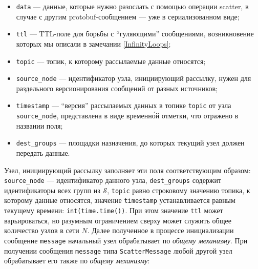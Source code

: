 \begin{itemize}
    \item \texttt{data} --- данные, которые нужно разослать с помощью операции scatter, в случае с другим protobuf-сообщением --- уже в сериализованном виде;
    
    \item \texttt{ttl} --- TTL-поле для борьбы с \enquote{гуляющими} сообщениями, возникновение которых мы описали в замечании \ref{InfinityLoops};
    
    \item \texttt{topic} --- топик, к которому рассылаемые данные относятся;
    
    \item \texttt{source\_node} --- идентификатор узла, инициирующий рассылку, нужен для раздельного версионирования сообщений от разных источников;
    
    \item \texttt{timestamp} --- \enquote{версия} рассылаемых данных в топике \texttt{topic} от узла \texttt{source\_node}, представлена в виде временн\'{о}й отметки, что отражено в названии поля;
    
    \item \texttt{dest\_groups} --- площадки назначения, до которых текущий узел должен передать данные.
\end{itemize}

Узел, инициирующий рассылку заполняет эти поля соответствующим образом: \\
\texttt{source\_node} --- идентификатор данного узла, \texttt{dest\_groups} содержит идентификаторы всех групп из $\mathcal{S}$, \texttt{topic} равно строковому значению топика, к которому данные относятся, значение \texttt{timestamp} устанавливается равным текущему времени: \texttt{int(time.time())}. При этом значение \texttt{ttl} может варьироваться, но разумным ограничением сверху может служить общее количество узлов в сети $N$. Далее полученное в процессе инициализации сообщение \texttt{message} начальный узел обрабатывает по \textit{общему механизму}. При получении сообщения \texttt{message} типа \texttt{ScatterMessage} любой другой узел обрабатывает его также по \textit{общему механизму}:

